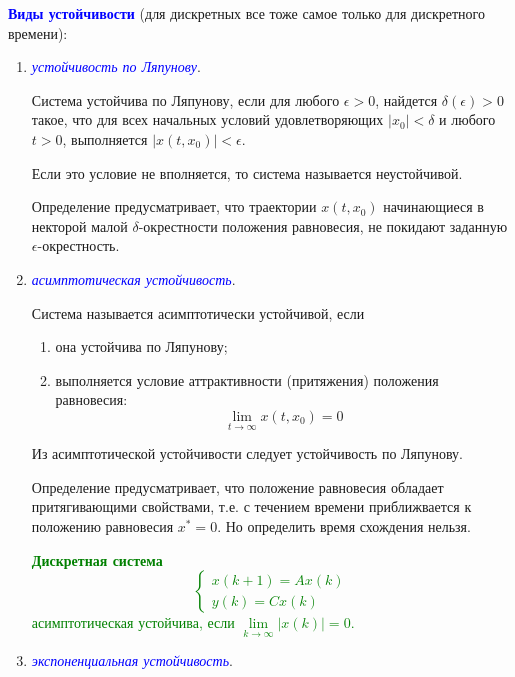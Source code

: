 \textcolor{blue}{\textbf{Виды устойчивости}} (для дискретных все тоже самое только для дискретного времени):
\begin{enumerate}
    \item \textcolor{blue}{\textit{устойчивость по Ляпунову}}.
    
    Система устойчива по Ляпунову, если для любого $\epsilon > 0$, найдется $\delta(\epsilon) > 0$ такое, что для всех начальных условий удовлетворяющих $|x_0| < \delta$ и любого $t>0$, выполняется $|x(t,x_0)| < \epsilon$.
    
    Если это условие не вполняется, то система называется неустойчивой.
    
    Определение предусматривает, что траектории $x(t,x_0)$ начинающиеся в некторой малой $\delta$-окрестности положения равновесия, не покидают заданную $\epsilon$-окрестность.
    
    \item \textcolor{blue}{\textit{асимптотическая устойчивость}}.
    
    Система называется асимптотически устойчивой, если
    \begin{enumerate}
        \item она устойчива по Ляпунову;
        \item выполняется условие аттрактивности (притяжения) положения равновесия:
        \begin{equation}
            \lim\limits_{t \rightarrow \infty} x(t, x_0) = 0
        \end{equation}
    \end{enumerate}
    Из асимптотической устойчивости следует устойчивость по Ляпунову.
    
    Определение предусматривает, что положение равновесия обладает притягивающими свойствами, т.е. с течением времени приближвается к положению равновесия $x^*=0$. Но определить время схождения нельзя.
    
    \textcolor{green}{
        \textbf{Дискретная система}
        \begin{equation}
            \begin{cases}
                x(k+1) = A x(k)\\
                y(k) = C x(k)
            \end{cases}
        \end{equation}
        асимптотическая устойчива, если $\lim\limits_{k \rightarrow \infty} |x(k)| = 0$.
    }
    
    
    \item \textcolor{blue}{\textit{экспоненциальная устойчивость}}.
    

\end{enumerate}

